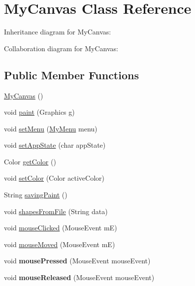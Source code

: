 \hypertarget{classMyCanvas}{}\section{My\+Canvas Class Reference}
\label{classMyCanvas}


Inheritance diagram for My\+Canvas\+:


Collaboration diagram for My\+Canvas\+:
\subsection*{Public Member Functions}
\begin{DoxyCompactItemize}
\item 
\hyperlink{classMyCanvas_ad66ffeff27547650fe0cbc19c67653b6}{My\+Canvas} ()
\item 
void \hyperlink{classMyCanvas_ac040ca723b00a27e0a3001745f745c02}{paint} (Graphics g)
\item 
void \hyperlink{classMyCanvas_a62132badab6a4da5f847d3815cc40c44}{set\+Menu} (\hyperlink{classMyMenu}{My\+Menu} menu)
\item 
void \hyperlink{classMyCanvas_a6f6db840dc7e9a6e4a42212912f01286}{set\+App\+State} (char app\+State)
\item 
Color \hyperlink{classMyCanvas_aa10bb36820671c508e71f9e8142f7178}{get\+Color} ()
\item 
void \hyperlink{classMyCanvas_a13b35b0c7537a55f61ba289697008e8f}{set\+Color} (Color active\+Color)
\item 
String \hyperlink{classMyCanvas_aa3ac394f78dd7faa9cfba16b15b3ecfa}{saving\+Paint} ()
\item 
void \hyperlink{classMyCanvas_a8d826ca38478d6a5b5cae7f418a898b3}{shapes\+From\+File} (String data)
\item 
void \hyperlink{classMyCanvas_aeeeef0f08f75509cb89d872ffda7a759}{mouse\+Clicked} (Mouse\+Event mE)
\item 
void \hyperlink{classMyCanvas_a50ce844ceff17225cb455a282514c733}{mouse\+Moved} (Mouse\+Event mE)
\item 
\mbox{\label{classMyCanvas_a062cf9b33725644d10e209a1d48a022d}} 
void {\bfseries mouse\+Pressed} (Mouse\+Event mouse\+Event)
\item 
\mbox{\label{classMyCanvas_a3ce0152266916020e9ae3381742a8cf2}} 
void {\bfseries mouse\+Released} (Mouse\+Event mouse\+Event)
\item 

\end{DoxyCompactItemize}
